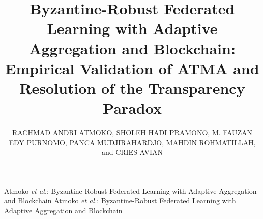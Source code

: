 \documentclass{ieeeaccess}
\begin{document}

\title{Byzantine-Robust Federated Learning with Adaptive Aggregation and Blockchain: Empirical Validation of ATMA and Resolution of the Transparency Paradox}

\author{\uppercase{Rachmad Andri Atmoko},
\uppercase{Sholeh Hadi Pramono},
\uppercase{M. Fauzan Edy Purnomo},
\uppercase{Panca Mudjirahardjo},
\uppercase{Mahdin Rohmatillah}, and
\uppercase{Cries Avian}}

\address[1]{Electrical Engineering Department, Faculty of Engineering, Universitas Brawijaya, Malang 65145, Indonesia}
\address[2]{Faculty of Vocational Studies, Universitas Brawijaya, Malang 65145, Indonesia}


\markboth
{Atmoko \textit{et al.}: Byzantine-Robust Federated Learning with Adaptive Aggregation and Blockchain}
{Atmoko \textit{et al.}: Byzantine-Robust Federated Learning with Adaptive Aggregation and Blockchain}

\end{document}
